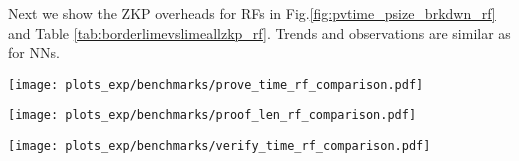 Next we show the ZKP overheads for RFs in Fig.\ref{fig:pvtime_psize_brkdwn_rf} and Table \ref{tab:borderlimevslimeallzkp_rf}. Trends and observations are similar as for NNs.

\begin{figure*}[hbt!]
    \centering
    \begin{minipage}{0.33\linewidth}
        \centering
        \texttt{[image: plots\_exp/benchmarks/prove\_time\_rf\_comparison.pdf]}
        \label{fig:prooftime_rf}
    \end{minipage}\hfill
    \begin{minipage}{0.33\linewidth}
        \centering
        \texttt{[image: plots\_exp/benchmarks/proof\_len\_rf\_comparison.pdf]}
        \label{fig:prooflen_rf}
    \end{minipage}\hfill
    \begin{minipage}{0.33\linewidth}
        \centering
        \texttt{[image: plots\_exp/benchmarks/verify\_time\_rf\_comparison.pdf]}
        \label{fig:verifytime_rf}
    \end{minipage}\hfill
    \caption{Results for RFs for $n=300$ neighboring points. Left: Proof Generation Time (in mins), Mid: Proof Size (in KBs), Right: Verification times (in secs) for different variants of Standard LIME. All configurations use the same number of Halo2 rows, $2^{18}$, and lookup tables of size 200k.}
    \label{fig:pvtime_psize_brkdwn_rf}
\end{figure*}


\begin{table}[H]
  \centering
  \smallskip
      \caption{\label{tab:borderlimevslimeallzkp_rf} ZKP Overhead of BorderLIME and Standard LIME (both  G+N variant) for RFs for 300 neighboring points. Overhead for BorderLIME is larger than that for LIME. Results are consistent across all datasets.}%
\end{table}


